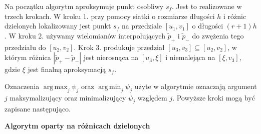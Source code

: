 \documentclass[oik, pdftex, robocza, man]{mgrwms}
\DeclareMathOperator*{\argmax}{arg\,max}
\DeclareMathOperator*{\argmin}{arg\,min}
\begin{document}
    Na początku algorytm aproksymuje punkt osobliwy $s_f$. Jest to realizowane w trzech krokach. W kroku 1. przy pomocy siatki o rozmiarze długości $h$ i różnic dzielonych lokalizowany jest punkt $s_f$ na przedziale $[u_1, v_1]$ o długości $(r + 1)h$. W kroku 2. używamy wielomianów interpolujących $\tilde{p}_+$ i $\tilde{p}_-$ do zwężenia tego przedziału do $[u_2, v_2]$. Krok 3. produkuje przedział $[u_3, v_3] \subseteq [u_2, v_2]$, w którym różnica $|\tilde{p}_{+} - \tilde{p}_{-}|$ jest nierosnąca na $[u_3, \xi]$ i niemalejąca na $[\xi, v_3]$, gdzie $\xi$ jest finalną aproksymacją $s_f$.

    Oznaczenia $\argmax_{j} \psi_{j}$ oraz $\argmin_{j} \psi_{j}$ użyte w algorytmie oznaczają argument $j$ maksymalizujący oraz minimalizujący $\psi_{j}$ względem $j$.
    Powyższe kroki mogą być zapisane następująco. \vspace{10pt}

    \newpage
    \textbf{Algorytm oparty na różnicach dzielonych}
\end{document}
